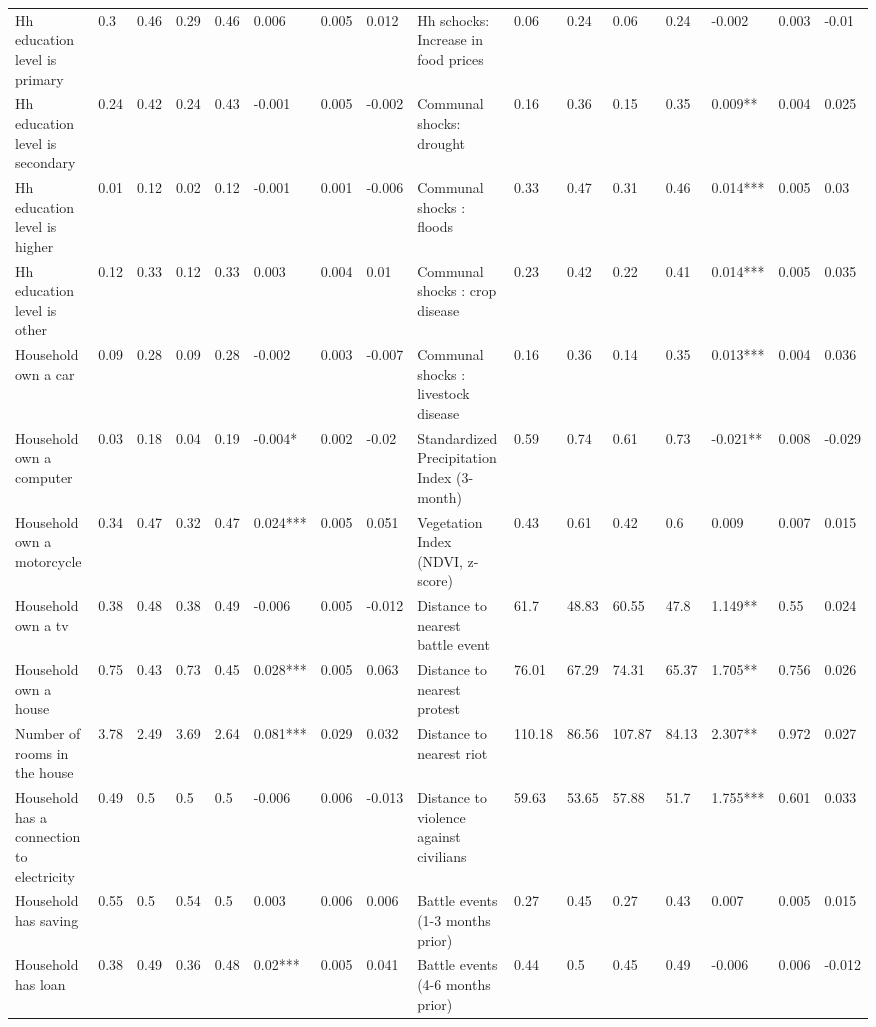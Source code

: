\begin{table}[H]
{\begin{tabular}{@{}llllllll|llllllll@{}}
Hh education level is primary & 0.3 & 0.46 & 0.29 & 0.46 & 0.006 & 0.005 & 0.012 & Hh schocks: Increase in food prices & 0.06 & 0.24 & 0.06 & 0.24 & -0.002 & 0.003 & -0.01 \\
Hh education level is secondary & 0.24 & 0.42 & 0.24 & 0.43 & -0.001 & 0.005 & -0.002 & Communal shocks: drought & 0.16 & 0.36 & 0.15 & 0.35 & 0.009** & 0.004 & 0.025 \\
Hh education level is higher & 0.01 & 0.12 & 0.02 & 0.12 & -0.001 & 0.001 & -0.006 & Communal shocks : floods & 0.33 & 0.47 & 0.31 & 0.46 & 0.014*** & 0.005 & 0.03 \\
Hh education level is other & 0.12 & 0.33 & 0.12 & 0.33 & 0.003 & 0.004 & 0.01 & Communal shocks : crop disease & 0.23 & 0.42 & 0.22 & 0.41 & 0.014*** & 0.005 & 0.035 \\
Household own a car & 0.09 & 0.28 & 0.09 & 0.28 & -0.002 & 0.003 & -0.007 & Communal shocks : livestock disease & 0.16 & 0.36 & 0.14 & 0.35 & 0.013*** & 0.004 & 0.036 \\
Household own a computer & 0.03 & 0.18 & 0.04 & 0.19 & -0.004* & 0.002 & -0.02 & Standardized Precipitation Index (3-month) & 0.59 & 0.74 & 0.61 & 0.73 & -0.021** & 0.008 & -0.029 \\
Household own a motorcycle & 0.34 & 0.47 & 0.32 & 0.47 & 0.024*** & 0.005 & 0.051 & Vegetation Index (NDVI, z-score) & 0.43 & 0.61 & 0.42 & 0.6 & 0.009 & 0.007 & 0.015 \\
Household own a tv & 0.38 & 0.48 & 0.38 & 0.49 & -0.006 & 0.005 & -0.012 & Distance to nearest battle event & 61.7 & 48.83 & 60.55 & 47.8 & 1.149** & 0.55 & 0.024 \\
Household own a house & 0.75 & 0.43 & 0.73 & 0.45 & 0.028*** & 0.005 & 0.063 & Distance to nearest protest & 76.01 & 67.29 & 74.31 & 65.37 & 1.705** & 0.756 & 0.026 \\
Number of rooms in the house & 3.78 & 2.49 & 3.69 & 2.64 & 0.081*** & 0.029 & 0.032 & Distance to nearest riot & 110.18 & 86.56 & 107.87 & 84.13 & 2.307** & 0.972 & 0.027 \\
Household has a connection to electricity & 0.49 & 0.5 & 0.5 & 0.5 & -0.006 & 0.006 & -0.013 & Distance to violence against civilians & 59.63 & 53.65 & 57.88 & 51.7 & 1.755*** & 0.601 & 0.033 \\
Household has saving & 0.55 & 0.5 & 0.54 & 0.5 & 0.003 & 0.006 & 0.006 & Battle events (1-3 months prior) & 0.27 & 0.45 & 0.27 & 0.43 & 0.007 & 0.005 & 0.015 \\
Household has loan & 0.38 & 0.49 & 0.36 & 0.48 & 0.02*** & 0.005 & 0.041 & Battle events (4-6 months prior) & 0.44 & 0.5 & 0.45 & 0.49 & -0.006 & 0.006 & -0.012 \\

\end{tabular}}
\end{table}
